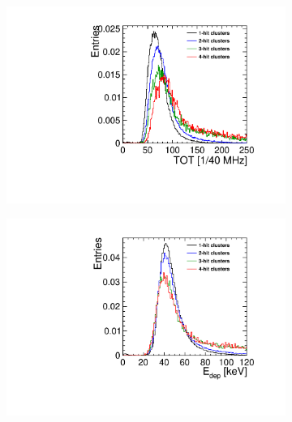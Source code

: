 \begin{figure}[htbp] \centering
  \begin{subfigure}[b]{0.32\textwidth}
    \includegraphics[width=\textwidth]{./figures/Calibration/TOT_Clusters_W0005_F01.pdf}
    \caption{}
  \end{subfigure}\hfill
  \begin{subfigure}[b]{0.32\textwidth}
    \includegraphics[width=\textwidth]{./figures/Calibration/Edep_Clusters_W0005_F01.pdf}
    \caption{}
  \end{subfigure}\hfill
  \begin{subfigure}[b]{0.32\textwidth}

\end{subfigure}
\end{figure}
